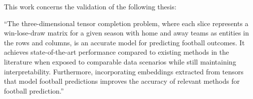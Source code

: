 \documentclass[thesis=M,english]{FITthesis}[2019/12/23]
\begin{document}
This work concerns the validation of the following thesis:

\vspace{0.5cm}
\hfill\begin{minipage}{0.90\textwidth}
``The three-dimensional tensor completion problem, where each slice represents a win-lose-draw matrix for a given season with home and away teams as entities in the rows and columns, is an accurate model for predicting football outcomes. It achieves state-of-the-art performance compared to existing methods in the literature when exposed to comparable data scenarios while still maintaining interpretability. Furthermore, incorporating embeddings extracted from tensors that model football predictions improves the accuracy of relevant methods for football prediction.''
\end{minipage}
\vspace{0.5cm}
\end{document}
